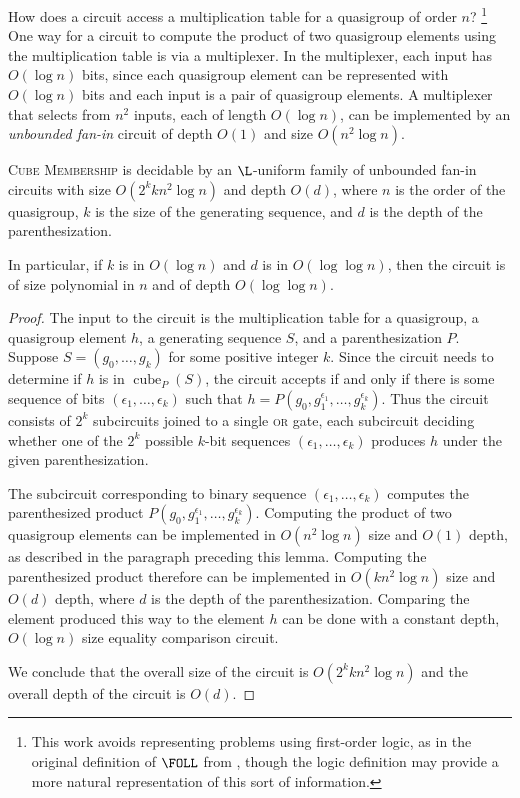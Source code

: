 \documentclass{article}
\DeclareMathOperator{\cube}{cube}
\begin{document}
How does a circuit access a multiplication table for a quasigroup of order $n$?
\footnote{This work avoids representing problems using first-order logic, as in the original definition of $\FOLL$ from \autocite{bklm01}, though the logic definition may provide a more natural representation of this sort of information.}
One way for a circuit to compute the product of two quasigroup elements using the multiplication table is via a multiplexer.
In the multiplexer, each input has $O(\log n)$ bits, since each quasigroup element can be represented with $O(\log n)$ bits and each input is a pair of quasigroup elements.
A multiplexer that selects from $n^2$ inputs, each of length $O(\log n)$, can be implemented by an \emph{unbounded fan-in} circuit of depth $O(1)$ and size $O(n^2 \log n)$.

\begin{lemma}\label{lem:cubemem}
  \textsc{Cube Membership} is decidable by an $\L$-uniform family of unbounded fan-in circuits with size $O(2^k k n^2 \log n)$ and depth $O(d)$, where $n$ is the order of the quasigroup, $k$ is the size of the generating sequence, and $d$ is the depth of the parenthesization.

  In particular, if $k$ is in $O(\log n)$ and $d$ is in $O(\log \log n)$, then the circuit is of size polynomial in $n$ and of depth $O(\log \log n)$.
\end{lemma}
\begin{proof}
  The input to the circuit is the multiplication table for a quasigroup, a quasigroup element $h$, a generating sequence $S$, and a parenthesization $P$.
  Suppose $S = (g_0, \dotsc, g_k)$ for some positive integer $k$.
  Since the circuit needs to determine if $h$ is in $\cube_P(S)$, the circuit accepts if and only if there is some sequence of bits $(\epsilon_1, \dotsc, \epsilon_k)$ such that $h = P(g_0, g_1^{\epsilon_1}, \dotsc, g_k^{\epsilon_k})$.
  Thus the circuit consists of $2^k$ subcircuits joined to a single \textsc{or} gate, each subcircuit deciding whether one of the $2^k$ possible $k$-bit sequences $(\epsilon_1, \dotsc, \epsilon_k)$ produces $h$ under the given parenthesization.

  The subcircuit corresponding to binary sequence $(\epsilon_1, \dotsc, \epsilon_k)$ computes the parenthesized product $P(g_0, g_1^{\epsilon_1}, \dotsc, g_k^{\epsilon_k})$.
  Computing the product of two quasigroup elements can be implemented in $O(n^2 \log n)$ size and $O(1)$ depth, as described in the paragraph preceding this lemma.
  Computing the parenthesized product therefore can be implemented in $O(k n^2 \log n)$ size and $O(d)$ depth, where $d$ is the depth of the parenthesization.
  Comparing the element produced this way to the element $h$ can be done with a constant depth, $O(\log n)$ size equality comparison circuit.

  We conclude that the overall size of the circuit is $O(2^k k n^2 \log n)$ and the overall depth of the circuit is $O(d)$.
\end{proof}
\end{document}
